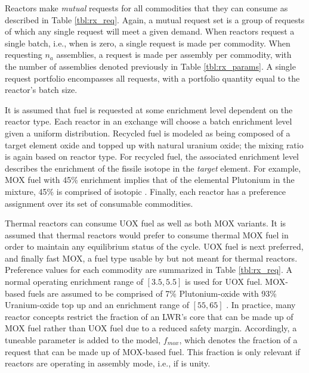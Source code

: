 Reactors make \textit{mutual} requests for all commodities that they can consume
as described in Table \ref{tbl:rx_req}. Again, a mutual request set is a group
of requests of which any single request will meet a given demand. When reactors
request a single batch, i.e., when \frx is zero, a single request is made
per commodity. When requesting $n_a$ assemblies, a request is made per assembly
per commodity, with the number of assemblies denoted previously in Table
\ref{tbl:rx_params}. A single request portfolio encompasses all requests, with a
portfolio quantity equal to the reactor's batch size.

It is assumed that fuel is requested at some enrichment level dependent on the
reactor type. Each reactor in an exchange will choose a batch enrichment level
given a uniform distribution. Recycled fuel is modeled as being composed of a
target element oxide and topped up with natural uranium oxide; the mixing ratio
is again based on reactor type. For recycled fuel, the associated enrichment
level describes the enrichment of the fissile isotope in the \textit{target}
element. For example, MOX fuel with 45\% enrichment implies that of the
elemental Plutonium in the mixture, 45\% is comprised of isotopic
. Finally, each reactor has a preference assignment over its set
of consumable commodities.

Thermal reactors can consume UOX fuel as well as both MOX variants. It is
assumed that thermal reactors would prefer to consume thermal MOX fuel in order
to maintain any equilibrium status of the cycle. UOX fuel is next preferred, and
finally fast MOX, a fuel type usable by but not meant for thermal
reactors. Preference values for each commodity are summarized in Table
\ref{tbl:rx_req}. A normal operating enrichment range of $[3.5, 5.5]$ is used
for UOX fuel. MOX-based fuels are assumed to be comprised of 7\% Plutonium-oxide
with 93\% Uranium-oxide top up \cite{bertel2007management} and an enrichment
range of $[55, 65]$ \cite{bairiot2003status}. In practice, many reactor concepts
restrict the fraction of an LWR's core that can be made up of MOX fuel rather
than UOX fuel due to a reduced safety margin. Accordingly, a tuneable parameter
is added to the model, $f_{mox}$, which denotes the fraction of a request that
can be made up of MOX-based fuel. This fraction is only relevant if reactors are
operating in assembly mode, i.e., if \frx is unity.

